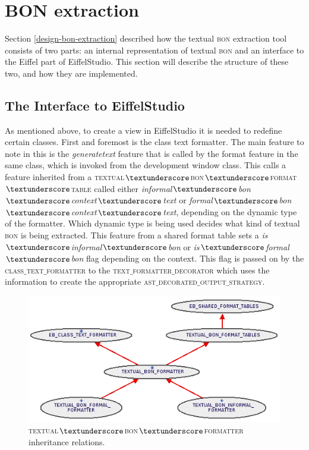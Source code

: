 \section{BON extraction}
Section \ref{design-bon-extraction} described how the textual \textsc{bon} extraction tool consists of two parts: an internal representation of textual \textsc{bon} and an interface to the Eiffel part of EiffelStudio. This section will describe the structure of these two, and how they are implemented.
\subsection{The Interface to EiffelStudio	}
\label{why_interface_takes_care_of_formal_and_informal}
As mentioned above, to create a view in EiffelStudio it is needed to redefine certain classes. First and foremost is the class text formatter. The main feature to note in this is the \textit{generate\textunderscore text} feature that is called by the format feature in the same class, which is invoked from the development window class. This calls a feature inherited from a \textsc{textual$\textunderscore$bon$\textunderscore$format$\textunderscore$table} called either \textit{informal$\textunderscore$bon$\textunderscore$context$\textunderscore$text} or \textit{formal$\textunderscore$bon$\textunderscore$context$\textunderscore$text}, depending on the dynamic type of the formatter. Which dynamic type is being used decides what kind of textual \textsc{bon} is being extracted. This feature from a shared format table sets a \textit{is$\textunderscore$informal$\textunderscore$bon} or \textit{is$\textunderscore$formal$\textunderscore$bon} flag depending on the context. This flag is passed on by the \textsc{class$\_$text$\_$formatter} to the \textsc{text$\_$formatter$\_$decorator} which uses the information to create the appropriate \textsc{ast$\_$decorated$\_$output$\_$strategy}.
\begin{figure}
\centerline{
\includegraphics[scale=0.7]{images/textual-bon-formatter.png}
}
\caption{\textsc{textual$\textunderscore$bon$\textunderscore$formatter} inheritance relations.}
\label{fig:textual_bon_formatter}
\end{figure}

